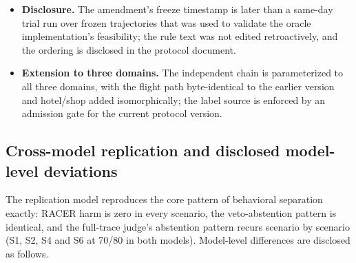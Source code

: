 \documentclass[review]{fcs}
\begin{document}
\begin{itemize}
  \item \textbf{Disclosure.} The amendment's freeze timestamp is later than a same-day trial run over frozen trajectories that was used to validate the oracle implementation's feasibility; the rule text was not edited retroactively, and the ordering is disclosed in the protocol document.

  \item \textbf{Extension to three domains.} The independent chain is parameterized to all three domains, with the flight path byte-identical to the earlier version and hotel/shop added isomorphically; the label source is enforced by an admission gate for the current protocol version.

\end{itemize}

\subsection{Cross-model replication and disclosed model-level deviations}

The replication model reproduces the core pattern of behavioral separation exactly: RACER harm is zero in every scenario, the veto-abstention pattern is identical, and the full-trace judge's abstention pattern recurs scenario by scenario (S1, S2, S4 and S6 at 70/80 in both models). Model-level differences are disclosed as follows.
\end{document}
